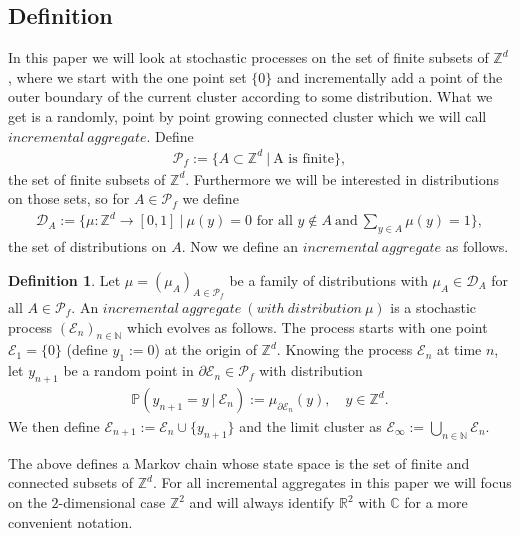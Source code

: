 \documentclass[12pt,a4paper]{scrartcl}
\numberwithin{equation}{subsection}
\newcommand{\C}{\mathbb{C}} %
\newcommand{\R}{\mathbb{R}} %
\newcommand{\Z}{\mathbb{Z}} %
\newcommand{\N}{\mathbb{N}} %
\newcommand{\E}{\mathcal{E}} %
\newcommand{\1}{\mathbbm{1}}
\numberwithin{equation}{section}
\theoremstyle{definition}
\newtheorem{definition}{Definition}[subsection]
\begin{document}
\subsection{Definition}

In this paper we will look at stochastic processes on the set of finite subsets of $\mathbb{Z}^d$, where we start with the one point set $\{0\}$ and incrementally add a point of the outer boundary of the current cluster according to some distribution. What we get is a randomly, point by point growing connected cluster which we will call $\mathit{incremental\ aggregate}$. Define 
\begin{align}
	\mathcal{P}_f := \{A\subset \mathbb{Z}^d\ |\ \text{A is finite}\}, 
\end{align}
the set of finite subsets of $\mathbb{Z}^d$. Furthermore we will be interested in distributions on those sets, so for $A\in \mathcal{P}_f$ we define 
\begin{align}
	\mathcal{D}_A:= \{\mu: \mathbb{Z}^d\to [0,1]\ |\ \mu(y) = 0 \text{ for all } y\notin A\ \text{and}\ \sum_{y\in A} \mu(y) = 1 \}, 
\end{align}
the set of distributions on $A$. Now we define an $\mathit{incremental\ aggregate}$ as follows.  

\begin{definition} \label{incrementalaggregate}
	Let $\mu=(\mu_A)_{A\in \mathcal{P}_f}$ be a family of distributions with $\mu_A\in \mathcal{D}_A$ for all $A\in \mathcal{P}_f$. An $\mathit{incremental\ aggregate\ (with\ distribution\ \mu)}$ is a stochastic process $(\mathcal{E}_n)_{n\in{\mathbb{N}}}$ which evolves as follows. The process starts with one point $\mathcal{E}_1 = \{0\}$ (define $y_1 :=0$) at the origin of $\mathbb{Z}^d$. Knowing the process $\mathcal{E}_n$ at time $n$, let $y_{n+1}$ be a random point in $\partial \mathcal{E}_n\in \mathcal{P}_f$ with distribution
	\begin{align}
		\mathbb{P}(y_{n+1} = y\ |\ \mathcal{E}_n) := \mu_{\partial \mathcal{E}_n}(y),\quad y\in \mathbb{Z}^d.
	\end{align}
	We then define $\mathcal{E}_{n+1} := \mathcal{E}_n \cup \{y_{n+1}\}$ and the limit cluster as $\E_\infty := \bigcup_{n\in\N} \E_n$. 
\end{definition} 

The above defines a Markov chain whose state space is the set of finite and connected subsets of $\Z^d$. For all incremental aggregates in this paper we will focus on the $2$-dimensional case $\Z^2$ and will always identify $\R^2$ with $\C$ for a more convenient notation. 
\end{document}
